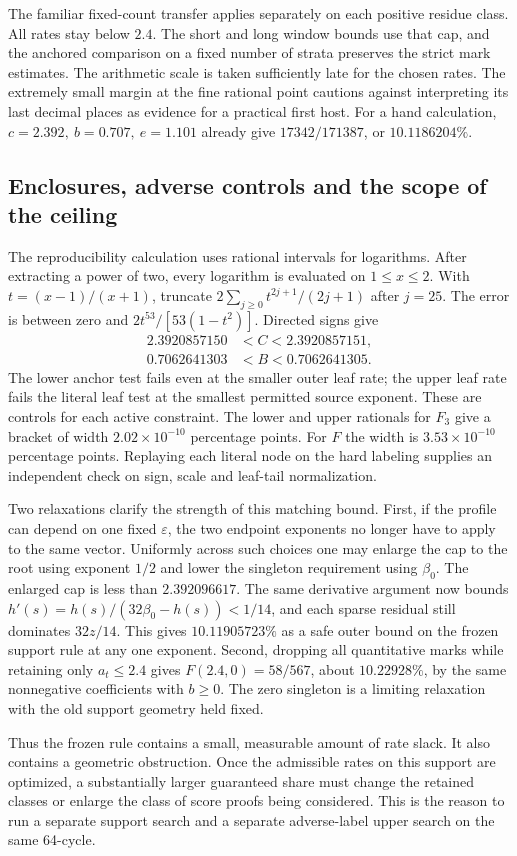 The familiar fixed-count transfer applies separately on each positive residue class. All rates stay below \(2.4\). The short and long window bounds use that cap, and the anchored comparison on a fixed number of strata preserves the strict mark estimates. The arithmetic scale is taken sufficiently late for the chosen rates. The extremely small margin at the fine rational point cautions against interpreting its last decimal places as evidence for a practical first host. For a hand calculation, \(c=2.392,\ b=0.707,\ e=1.101\) already give \(17342/171387\), or \(10.1186204\%\).

\subsection{Enclosures, adverse controls and the scope of the ceiling}

The reproducibility calculation uses rational intervals for logarithms. After extracting a power of two, every logarithm is evaluated on \(1\le x\le2\). With \(t=(x-1)/(x+1)\), truncate \(2\sum_{j\ge0}t^{2j+1}/(2j+1)\) after \(j=25\). The error is between zero and \(2t^{53}/[53(1-t^2)]\). Directed signs give
\[
\begin{split}
2.3920857150 &< C < 2.3920857151,\\
0.7062641303 &< B < 0.7062641305 .
\end{split}
\]
The lower anchor test fails even at the smaller outer leaf rate; the upper leaf rate fails the literal leaf test at the smallest permitted source exponent. These are controls for each active constraint. The lower and upper rationals for \(F_3\) give a bracket of width \(2.02\times10^{-10}\) percentage points. For \(F\) the width is \(3.53\times10^{-10}\) percentage points. Replaying each literal node on the hard labeling supplies an independent check on sign, scale and leaf-tail normalization.

Two relaxations clarify the strength of this matching bound. First, if the profile can depend on one fixed \(\varepsilon\), the two endpoint exponents no longer have to apply to the same vector. Uniformly across such choices one may enlarge the cap to the root using exponent \(1/2\) and lower the singleton requirement using \(\beta_0\). The enlarged cap is less than \(2.392096617\). The same derivative argument now bounds \(h'(s)=h(s)/(32\beta_0-h(s))<1/14\), and each sparse residual still dominates \(32z/14\). This gives \(10.11905723\%\) as a safe outer bound on the frozen support rule at any one exponent. Second, dropping all quantitative marks while retaining only \(a_t\le2.4\) gives \(F(2.4,0)=58/567\), about \(10.22928\%\), by the same nonnegative coefficients with \(b\ge0\). The zero singleton is a limiting relaxation with the old support geometry held fixed.

Thus the frozen rule contains a small, measurable amount of rate slack. It also contains a geometric obstruction. Once the admissible rates on this support are optimized, a substantially larger guaranteed share must change the retained classes or enlarge the class of score proofs being considered. This is the reason to run a separate support search and a separate adverse-label upper search on the same 64-cycle.
